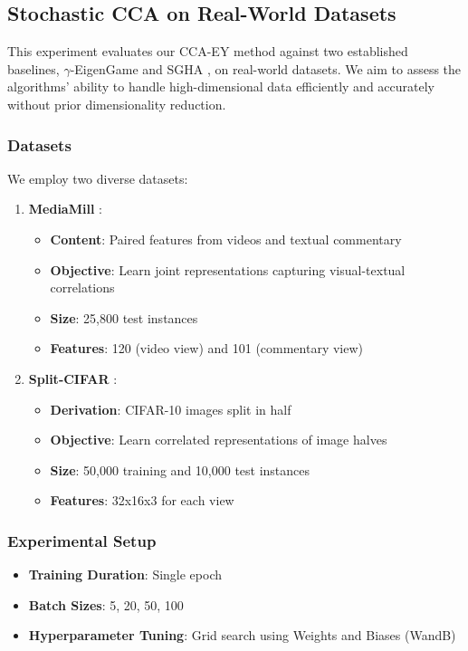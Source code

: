\subsection{Stochastic CCA on Real-World Datasets}
This experiment evaluates our CCA-EY method against two established baselines, $\gamma$-EigenGame \citep{gemp2022generalized} and SGHA \citep{chen2019constrained}, on real-world datasets. We aim to assess the algorithms' ability to handle high-dimensional data efficiently and accurately without prior dimensionality reduction.

\subsubsection{Datasets}
We employ two diverse datasets:

\begin{enumerate}
    \item \textbf{MediaMill} \citep{gemert2008visual}:
        \begin{itemize}
            \item \textbf{Content}: Paired features from videos and textual commentary
            \item \textbf{Objective}: Learn joint representations capturing visual-textual correlations
            \item \textbf{Size}: 25,800 test instances
            \item \textbf{Features}: 120 (video view) and 101 (commentary view)
        \end{itemize}
    
    \item \textbf{Split-CIFAR} \citep{meng2021online}:
        \begin{itemize}
            \item \textbf{Derivation}: CIFAR-10 images split in half
            \item \textbf{Objective}: Learn correlated representations of image halves
            \item \textbf{Size}: 50,000 training and 10,000 test instances
            \item \textbf{Features}: 32x16x3 for each view
        \end{itemize}
\end{enumerate}

\subsubsection{Experimental Setup}
\begin{itemize}
    \item \textbf{Training Duration}: Single epoch
    \item \textbf{Batch Sizes}: 5, 20, 50, 100
    \item \textbf{Hyperparameter Tuning}: Grid search using Weights and Biases (WandB) \citep{wandb}
\end{itemize}

